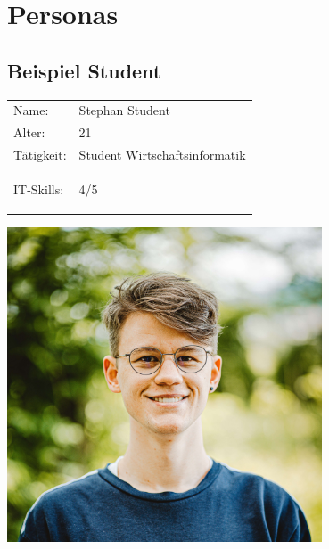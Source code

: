 






















\section{Personas}


\subsection{Beispiel Student}

\begin{minipage}[t]{0.5\textwidth}
	\vspace{-4cm}
	\renewcommand{\arraystretch}{1.5}
	\begin{tabular}{l l}
		Name: & Stephan Student \\
		Alter: & 21 \\
		Tätigkeit: & Student Wirtschaftsinformatik \\
		IT-Skills: & 4/5 \hspace{-1cm} \begin{barchart}{5.0}
			\baritemNL{}{4}
		\end{barchart} \\
	\end{tabular}
\end{minipage}
\hfill
\begin{minipage}[t]{0.4\textwidth}
	\flushright
	\includegraphics[width=0.70\textwidth]{img/carlos-lindner-ZVo7vtXilCs-unsplash.jpg}
\end{minipage}

